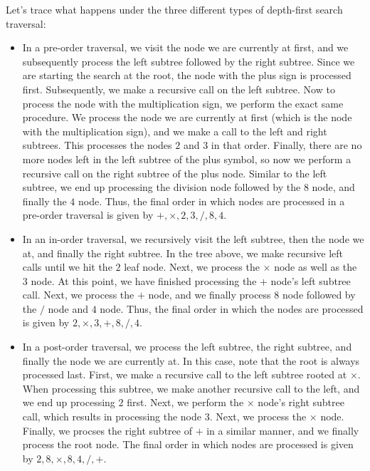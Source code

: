 Let's trace what happens under the three different types of depth-first search traversal:

\begin{itemize}
    \item In a pre-order traversal, we visit the node we are currently at first, and we subsequently process the left subtree followed by the right subtree. Since we are starting the search at the root, the node with the plus sign is processed first. Subsequently, we make a recursive call on the left subtree. Now to process the node with the multiplication sign, we perform the exact same procedure. We process the node we are currently at first (which is the node with the multiplication sign), and we make a call to the left and right subtrees. This processes the nodes $2$ and $3$ in that order. Finally, there are no more nodes left in the left subtree of the plus symbol, so now we perform a recursive call on the right subtree of the plus node. Similar to the left subtree, we end up processing the division node followed by the $8$ node, and finally the $4$ node. Thus, the final order in which nodes are processed in a pre-order traversal is given by $+, \times, 2, 3, /, 8, 4$. 
    \item In an in-order traversal, we recursively visit the left subtree, then the node we at, and finally the right subtree. In the tree above, we make recursive left calls until we hit the $2$ leaf node. Next, we process the $\times$ node as well as the $3$ node. At this point, we have finished processing the $+$ node's left subtree call. Next, we process the $+$ node, and we finally process $8$ node followed by the $/$ node and $4$ node. Thus, the final order in which the nodes are processed is given by $2, \times, 3, +, 8, /, 4$. 
    \item In a post-order traversal, we process the left subtree, the right subtree, and finally the node we are currently at. In this case, note that the root is always processed last. First, we make a recursive call to the left subtree rooted at $\times$. When processing this subtree, we make another recursive call to the left, and we end up processing $2$ first. Next, we perform the $\times$ node's right subtree call, which results in processing the node $3$. Next, we process the $\times$ node. Finally, we procses the right subtree of $+$ in a similar manner, and we finally process the root node. The final order in which nodes are processed is given by $2, 8, \times, 8, 4, /, +$. 
\end{itemize}


